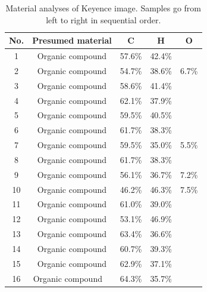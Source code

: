 \documentclass[twocolumn]{article}
\begin{document}
            \begin{table}
                \centering
                \begin{tabular}{@{}cccccc@{}}
                    \toprule
                    No. & \multicolumn{2}{c}{Presumed material} & C      & H      & O     \\ \midrule
                    1   & \multicolumn{2}{c}{Organic compound}  & 57.6\% & 42.4\% &       \\
                    2   & \multicolumn{2}{c}{Organic compound}  & 54.7\% & 38.6\% & 6.7\% \\
                    3   & \multicolumn{2}{c}{Organic compound}  & 58.6\% & 41.4\% &       \\
                    4   & \multicolumn{2}{c}{Organic compound}  & 62.1\% & 37.9\% &       \\
                    5   & \multicolumn{2}{c}{Organic compound}  & 59.5\% & 40.5\% &       \\
                    6   & \multicolumn{2}{c}{Organic compound}  & 61.7\% & 38.3\% &       \\
                    7   & \multicolumn{2}{c}{Organic compound}  & 59.5\% & 35.0\% & 5.5\% \\
                    8   & \multicolumn{2}{c}{Organic compound}  & 61.7\% & 38.3\% &       \\
                    9   & \multicolumn{2}{c}{Organic compound}  & 56.1\% & 36.7\% & 7.2\% \\
                    10  & \multicolumn{2}{c}{Organic compound}  & 46.2\% & 46.3\% & 7.5\% \\
                    11  & \multicolumn{2}{c}{Organic compound}  & 61.0\% & 39.0\% &       \\
                    12  & \multicolumn{2}{c}{Organic compound}  & 53.1\% & 46.9\% &       \\
                    13  & \multicolumn{2}{c}{Organic compound}  & 63.4\% & 36.6\% &       \\
                    14  & \multicolumn{2}{c}{Organic compound}  & 60.7\% & 39.3\% &       \\
                    15  & \multicolumn{2}{c}{Organic compound}  & 62.9\% & 37.1\% &       \\
                    16  & Organic compound          &           & 64.3\% & 35.7\% &       \\ \bottomrule
                \end{tabular}
                \caption{Material analyses of Keyence image. Samples go from left to right in sequential order.}\label{tab:key}
            \end{table}
\end{document}
